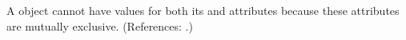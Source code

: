 A \Species object cannot have values for both its
 and  attributes because
these attributes are mutually exclusive.  (References: .)
